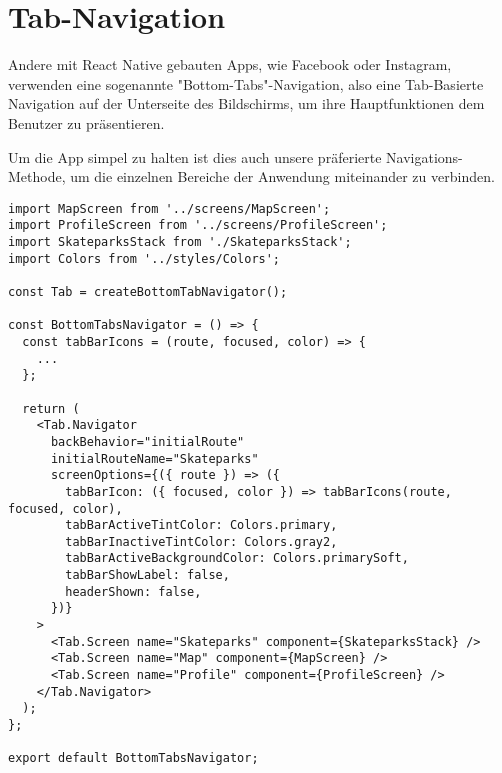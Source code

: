 \section{Tab-Navigation}
Andere mit React Native gebauten Apps, wie Facebook oder Instagram, verwenden eine sogenannte
"Bottom-Tabs"-Navigation, also eine Tab-Basierte Navigation auf der Unterseite des Bildschirms, um
ihre Hauptfunktionen dem Benutzer zu präsentieren.

Um die App simpel zu halten ist dies auch unsere präferierte Navigations-Methode, um die einzelnen
Bereiche der Anwendung miteinander zu verbinden.

\begin{lstlisting}
import MapScreen from '../screens/MapScreen';
import ProfileScreen from '../screens/ProfileScreen';
import SkateparksStack from './SkateparksStack';
import Colors from '../styles/Colors';

const Tab = createBottomTabNavigator();

const BottomTabsNavigator = () => {
  const tabBarIcons = (route, focused, color) => {
    ...
  };

  return (
    <Tab.Navigator
      backBehavior="initialRoute"
      initialRouteName="Skateparks"
      screenOptions={({ route }) => ({
        tabBarIcon: ({ focused, color }) => tabBarIcons(route, focused, color),
        tabBarActiveTintColor: Colors.primary,
        tabBarInactiveTintColor: Colors.gray2,
        tabBarActiveBackgroundColor: Colors.primarySoft,
        tabBarShowLabel: false,
        headerShown: false,
      })}
    >
      <Tab.Screen name="Skateparks" component={SkateparksStack} />
      <Tab.Screen name="Map" component={MapScreen} />
      <Tab.Screen name="Profile" component={ProfileScreen} />
    </Tab.Navigator>
  );
};

export default BottomTabsNavigator;
\end{lstlisting}


